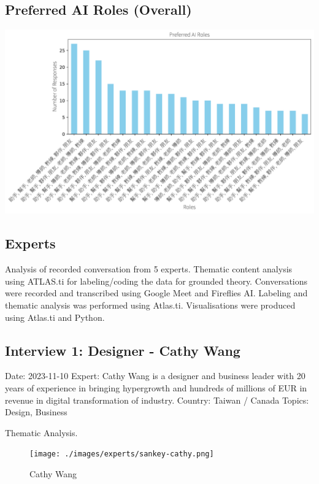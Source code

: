 \documentclass[
  letterpaper,
  DIV=11,
  numbers=noendperiod]{scrartcl}
\begin{document}
\subsection{Preferred AI Roles
(Overall)}\label{preferred-ai-roles-overall}

\includegraphics{_thesis_files/figure-pdf/cell-89-output-1.pdf}

\newpage

\subsection{Experts}\label{experts}

Analysis of recorded conversation from 5 experts. Thematic content
analysis using ATLAS.ti for labeling/coding the data for grounded
theory. Conversations were recorded and transcribed using Google Meet
and Fireflies AI. Labeling and thematic analysis was performed using
Atlas.ti. Visualisations were produced using Atlas.ti and Python.

\subsection{Interview 1: Designer - Cathy
Wang}\label{interview-1-designer---cathy-wang}

Date: 2023-11-10 Expert: Cathy Wang is a designer and business leader
with 20 years of experience in bringing hypergrowth and hundreds of
millions of EUR in revenue in digital transformation of industry.
Country: Taiwan / Canada Topics: Design, Business

Thematic Analysis.

\begin{figure}[H]

{\centering \texttt{[image: ./images/experts/sankey-cathy.png]}

}

\caption{Cathy Wang}

\end{figure}%
\end{document}
